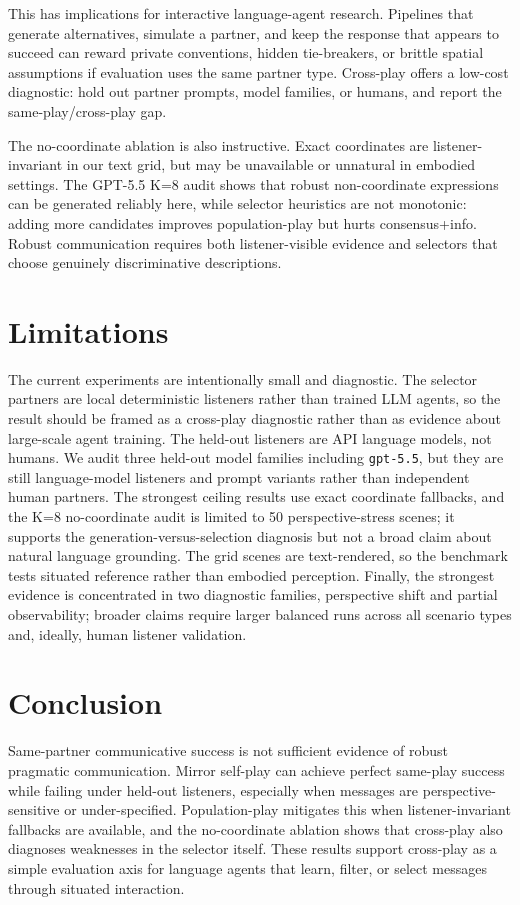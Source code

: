 This has implications for interactive language-agent research. Pipelines that generate alternatives, simulate a partner, and keep the response that appears to succeed can reward private conventions, hidden tie-breakers, or brittle spatial assumptions if evaluation uses the same partner type. Cross-play offers a low-cost diagnostic: hold out partner prompts, model families, or humans, and report the same-play/cross-play gap.

The no-coordinate ablation is also instructive. Exact coordinates are listener-invariant in our text grid, but may be unavailable or unnatural in embodied settings. The GPT-5.5 K=8 audit shows that robust non-coordinate expressions can be generated reliably here, while selector heuristics are not monotonic: adding more candidates improves population-play but hurts consensus+info. Robust communication requires both listener-visible evidence and selectors that choose genuinely discriminative descriptions.

\section{Limitations}

The current experiments are intentionally small and diagnostic. The selector partners are local deterministic listeners rather than trained LLM agents, so the result should be framed as a cross-play diagnostic rather than as evidence about large-scale agent training. The held-out listeners are API language models, not humans. We audit three held-out model families including \texttt{gpt-5.5}, but they are still language-model listeners and prompt variants rather than independent human partners. The strongest ceiling results use exact coordinate fallbacks, and the K=8 no-coordinate audit is limited to 50 perspective-stress scenes; it supports the generation-versus-selection diagnosis but not a broad claim about natural language grounding. The grid scenes are text-rendered, so the benchmark tests situated reference rather than embodied perception. Finally, the strongest evidence is concentrated in two diagnostic families, perspective shift and partial observability; broader claims require larger balanced runs across all scenario types and, ideally, human listener validation.

\section{Conclusion}

Same-partner communicative success is not sufficient evidence of robust pragmatic communication. Mirror self-play can achieve perfect same-play success while failing under held-out listeners, especially when messages are perspective-sensitive or under-specified. Population-play mitigates this when listener-invariant fallbacks are available, and the no-coordinate ablation shows that cross-play also diagnoses weaknesses in the selector itself. These results support cross-play as a simple evaluation axis for language agents that learn, filter, or select messages through situated interaction.
